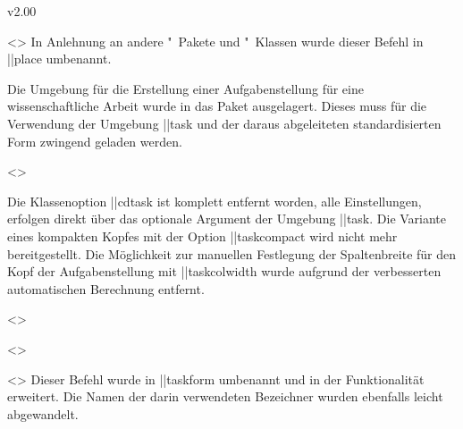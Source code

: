 \begin{Changes}{v2.00}
\begin{Obsolete}
  {}
  <>
\printdeclarationlist
%
In Anlehnung an andere "~Pakete und "~Klassen wurde 
dieser Befehl in \Macro||{place} umbenannt.
\end{Obsolete}

\minisec{\taskname}
%
\begin{Entity}{}
Die Umgebung für die Erstellung einer Aufgabenstellung für eine 
wissenschaftliche Arbeit wurde in das Paket  
ausgelagert. Dieses muss für die Verwendung der Umgebung \Environment||{task} 
und der daraus abgeleiteten standardisierten Form zwingend geladen werden.

\begin{Obsolete}
  {}
  <>
\begin{Obsolete}
  {}
\begin{Obsolete}
  {}
\printdeclarationlist
%
Die Klassenoption \Option||{cdtask} ist komplett entfernt worden, alle 
Einstellungen, erfolgen direkt über das optionale Argument der Umgebung 
\Environment||{task}. Die Variante eines kompakten Kopfes mit der Option 
\Option||{taskcompact} wird nicht mehr bereitgestellt. Die Möglichkeit zur 
manuellen Festlegung der Spaltenbreite für den Kopf der Aufgabenstellung mit 
\Length||{taskcolwidth} wurde aufgrund der verbesserten automatischen 
Berechnung entfernt.
\end{Obsolete}
\end{Obsolete}
\end{Obsolete}

\begin{Obsolete}
  {}
  <>
\begin{Obsolete}
  {}
  <>
\begin{Obsolete}
  {}
  <>
\printdeclarationlist
%
Dieser Befehl wurde in \Macro||{taskform} umbenannt und in der Funktionalität 
erweitert. Die Namen der darin verwendeten Bezeichner wurden ebenfalls leicht 
abgewandelt.
\end{Obsolete}
\end{Obsolete}
\end{Obsolete}


\end{Entity}
\end{Changes}
